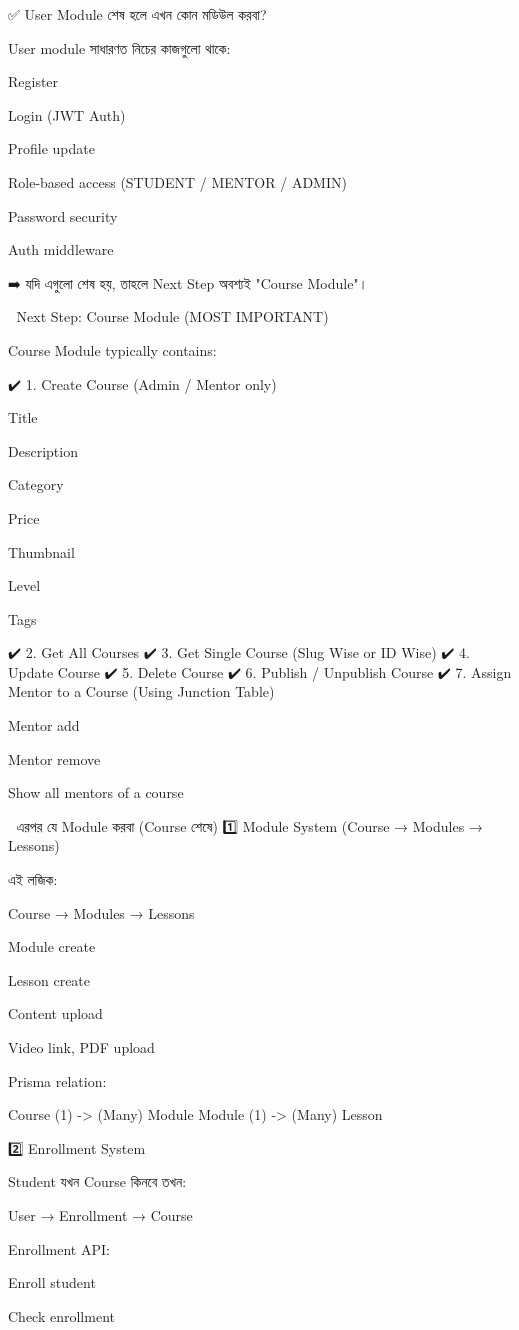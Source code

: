 ✅ User Module শেষ হলে এখন কোন মডিউল করবা?

User module সাধারণত নিচের কাজগুলো থাকে:

Register

Login (JWT Auth)

Profile update

Role-based access (STUDENT / MENTOR / ADMIN)

Password security

Auth middleware

➡️ যদি এগুলো শেষ হয়, তাহলে Next Step অবশ্যই "Course Module"।

🚀 Next Step: Course Module (MOST IMPORTANT)

Course Module typically contains:

✔️ 1. Create Course (Admin / Mentor only)

Title

Description

Category

Price

Thumbnail

Level

Tags

✔️ 2. Get All Courses
✔️ 3. Get Single Course (Slug Wise or ID Wise)
✔️ 4. Update Course
✔️ 5. Delete Course
✔️ 6. Publish / Unpublish Course
✔️ 7. Assign Mentor to a Course (Using Junction Table)

Mentor add

Mentor remove

Show all mentors of a course

🧩 এরপর যে Module করবা (Course শেষে)
1️⃣ Module System (Course → Modules → Lessons)

এই লজিক:

Course → Modules → Lessons

Module create

Lesson create

Content upload

Video link, PDF upload

Prisma relation:

Course (1) -> (Many) Module
Module (1) -> (Many) Lesson

2️⃣ Enrollment System

Student যখন Course কিনবে তখন:

User → Enrollment → Course


Enrollment API:

Enroll student

Check enrollment


